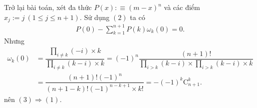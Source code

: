 \begin{bt}[Romania]
{		Trở lại bài toán, xét đa thức $P(x):\equiv (m-x)^n$ và các điểm $x_j:=j\ (1\leq j\leq n+1)$. Sử dụng $(2)$ ta có
		\begin{align}
		P(0)-\displaystyle\sum\limits_{k=1}^{n+1}P(k)\omega_k(0)=0. \tag{3}
		\end{align}
		Nhưng
		\begin{align*}
		\omega_k(0) &=\dfrac{\displaystyle\prod_{i\ne k}(-i)\times k}{\displaystyle\prod_{i\ne k}(k-i)\times k} = (-1)^n\dfrac{(n+1)!}{\displaystyle\prod_{i>k}(k-i)\times\displaystyle\prod\limits_{i>k}(k-i)\times k}\\
		& = \dfrac{(n+1)!(-1)^n}{(n+1-k)!(-1)^{n-k+1}\times k!}=-(-1)^k\mathrm{C}^k_{n+1}.
		\end{align*}
		nên $(3)\Rightarrow (1)$.
	}
\end{bt}

